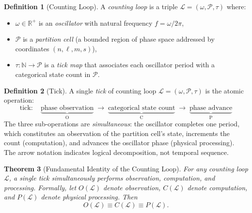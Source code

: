 \documentclass[twocolumn,10pt]{article}
\newtheorem{theorem}{Theorem}[section]
\theoremstyle{definition}
\newtheorem{definition}[theorem]{Definition}
\begin{document}
\begin{definition}[Counting Loop]
\label{def:counting-loop}
A \emph{counting loop} is a triple $\mathcal{L} = (\omega, \mathcal{P}, \tau)$ where:
\begin{itemize}[leftmargin=*]
\item $\omega \in \mathbb{R}^+$ is an \emph{oscillator} with natural frequency $f = \omega / 2\pi$,
\item $\mathcal{P}$ is a \emph{partition cell} (a bounded region of phase space addressed by coordinates $(n, \ell, m, s)$),
\item $\tau: \mathbb{N} \to \mathcal{P}$ is a \emph{tick map} that associates each oscillator period with a categorical state count in $\mathcal{P}$.
\end{itemize}
\end{definition}

\begin{definition}[Tick]
\label{def:tick}
A single \emph{tick} of counting loop $\mathcal{L} = (\omega, \mathcal{P}, \tau)$ is the atomic operation:
\begin{equation}
\text{tick}: \quad \underbrace{\text{phase observation}}_{\text{O}} \;\longrightarrow\; \underbrace{\text{categorical state count}}_{\text{C}} \;\longrightarrow\; \underbrace{\text{phase advance}}_{\text{P}}
\label{eq:tick}
\end{equation}
The three sub-operations are \emph{simultaneous}: the oscillator completes one period, which constitutes an observation of the partition cell's state, increments the count (computation), and advances the oscillator phase (physical processing). The arrow notation indicates logical decomposition, not temporal sequence.
\end{definition}

\begin{theorem}[Fundamental Identity of the Counting Loop]
\label{thm:counting-identity}
For any counting loop $\mathcal{L}$, a single tick simultaneously performs observation, computation, and processing. Formally, let $O(\mathcal{L})$ denote observation, $C(\mathcal{L})$ denote computation, and $P(\mathcal{L})$ denote physical processing. Then
\begin{equation}
O(\mathcal{L}) \equiv C(\mathcal{L}) \equiv P(\mathcal{L}).
\end{equation}
\end{theorem}
\end{document}
